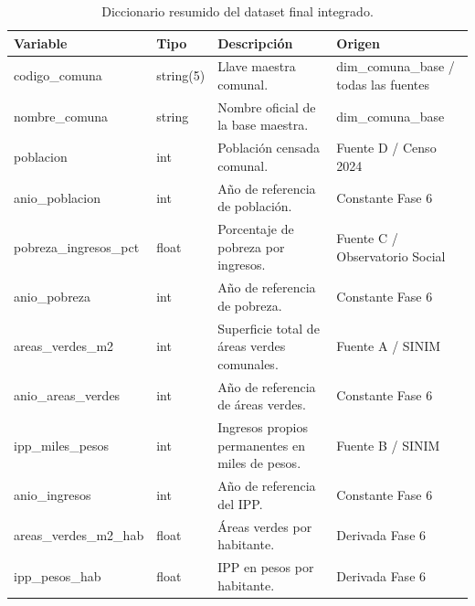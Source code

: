 \begin{table}[htbp]
\centering
\footnotesize
\caption{Diccionario resumido del dataset final integrado.}
\begin{tabular}{|p{3.2cm}|p{1.8cm}|p{5.5cm}|p{3.5cm}|}
\hline
Variable & Tipo & Descripción & Origen \\
\hline
codigo\_comuna & string(5) & Llave maestra comunal. & dim\_comuna\_base / todas las fuentes \\
nombre\_comuna & string & Nombre oficial de la base maestra. & dim\_comuna\_base \\
poblacion & int & Población censada comunal. & Fuente D / Censo 2024 \\
anio\_poblacion & int & Año de referencia de población. & Constante Fase 6 \\
pobreza\_ingresos\_pct & float & Porcentaje de pobreza por ingresos. & Fuente C / Observatorio Social \\
anio\_pobreza & int & Año de referencia de pobreza. & Constante Fase 6 \\
areas\_verdes\_m2 & int & Superficie total de áreas verdes comunales. & Fuente A / SINIM \\
anio\_areas\_verdes & int & Año de referencia de áreas verdes. & Constante Fase 6 \\
ipp\_miles\_pesos & int & Ingresos propios permanentes en miles de pesos. & Fuente B / SINIM \\
anio\_ingresos & int & Año de referencia del IPP. & Constante Fase 6 \\
areas\_verdes\_m2\_hab & float & Áreas verdes por habitante. & Derivada Fase 6 \\
ipp\_pesos\_hab & float & IPP en pesos por habitante. & Derivada Fase 6 \\
\hline
\end{tabular}
\end{table}
